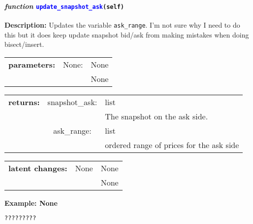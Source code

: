 \paragraph{\textit{function} \textcolor{blue}{\texttt{update\_snapshot\_ask}}\texttt{(self)}}\hfill\break
\noindent \textbf{Description:} Updates the variable \texttt{ask\_range}. I'm not sure why I need to do this but it does keep update snapshot bid/ask from making mistakes when doing bisect/insert. 


\begin{tabular}{r r l }
	\textbf{parameters:}	& None: & None\\
	&  & None\\
\end{tabular}

\begin{tabular}{l c l}
	\textbf{returns:} & snapshot\_ask: & list\\
	& & The snapshot on the ask side. \\
	& ask\_range: & list\\
	&& ordered range of prices for the ask side \\
\end{tabular}

\begin{tabular}{l c l}
	\textbf{latent changes:} & None & None\\
	& &  None
\end{tabular}

\textbf{Example: None}
\begin{lstlisting}[language=Python]
	?????????
\end{lstlisting}